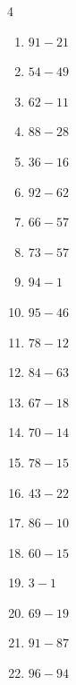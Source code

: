 \begin{multicols}{4}
\begin{enumerate}
  \item $91-21$
        \phantom{$=70$}

  \item $54-49$
        \phantom{$=5$}

  \item $62-11$
        \phantom{$=51$}

  \item $88-28$
        \phantom{$=60$}

  \item $36-16$
        \phantom{$=20$}

  \item $92-62$
        \phantom{$=30$}

  \item $66-57$
        \phantom{$=9$}

  \item $73-57$
        \phantom{$=16$}

  \item $94-1$
        \phantom{$=93$}

  \item $95-46$
        \phantom{$=49$}

  \item $78-12$
        \phantom{$=66$}

  \item $84-63$
        \phantom{$=21$}

  \item $67-18$
        \phantom{$=49$}

  \item $70-14$
        \phantom{$=56$}

  \item $78-15$
        \phantom{$=63$}

  \item $43-22$
        \phantom{$=21$}

  \item $86-10$
        \phantom{$=76$}

  \item $60-15$
        \phantom{$=45$}

  \item $3-1$
        \phantom{$=2$}

  \item $69-19$
        \phantom{$=50$}

  \item $91-87$
        \phantom{$=4$}

  \item $96-94$
        \phantom{$=2$}


\end{enumerate}
\end{multicols}
